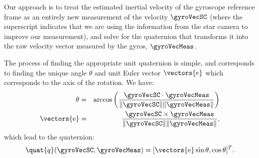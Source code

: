 Our approach is to treat the estimated inertial velocity of the gyroscope reference frame as an entirely new measurement of the velocity $\gyroVecSC$ (where the superscript indicates that we are using the information from the star camera to improve our measurement), and solve for the quaternion that transforms it into the raw velocity vector measured by the gyros, $\gyroVecMeas$.

The process of finding the appropriate unit quaternion is simple, and corresponds to finding the unique angle $\theta$ and unit Euler vector $\vectors{e}$ which corresponds to the axis of the rotation. We have:
\begin{eqnarray}
\theta &=& \arccos\left(\frac{\gyroVecSC\cdot\gyroVecMeas}{\Vert\gyroVecSC\Vert\Vert \gyroVecMeas \Vert}\right) \\
\vectors{\textrm{e}} &=& \frac{\gyroVecSC\times\gyroVecMeas}{\Vert\gyroVecSC\Vert\Vert \gyroVecMeas \Vert},
\end{eqnarray}
which lead to the quaternion:
\begin{equation}
\quat{q}(\gyroVecSC,\gyroVecMeas) =  [\vectors{\textrm{e}}\sin\theta,\cos\theta]^T.
\end{equation}




